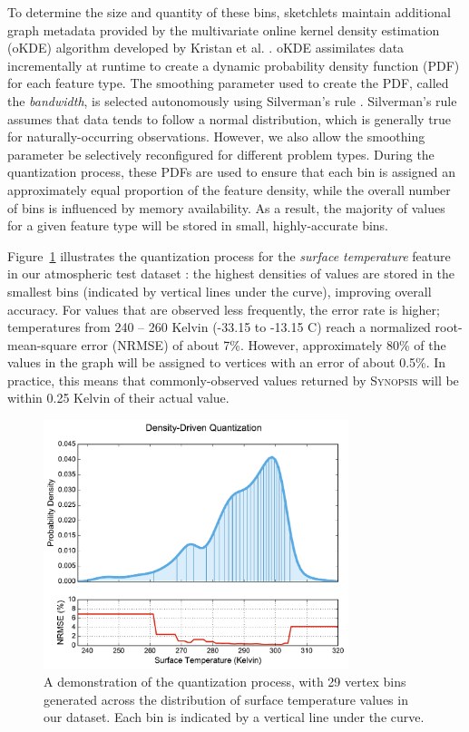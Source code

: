 To determine the size and quantity of these bins, sketchlets maintain additional graph metadata provided by the multivariate online kernel density estimation (oKDE) algorithm developed by Kristan et al. \cite{kristan2011multivariate}. oKDE assimilates data incrementally at runtime to create a dynamic probability density function (PDF) for each feature type. The smoothing parameter used to create the PDF, called the \emph{bandwidth}, is selected autonomously using Silverman's rule \cite{silverman1986density}. Silverman's rule assumes that data tends to follow a normal distribution, which is generally true for naturally-occurring observations. However, we also allow the smoothing parameter be selectively reconfigured for different problem types. During the quantization process, these PDFs are used to ensure that each bin is assigned an approximately equal proportion of the feature density, while the overall number of bins is influenced by memory availability. As a result, the majority of values for a given feature type will be stored in small, highly-accurate bins.

Figure~\ref{fig:quantization} illustrates the quantization process for the \emph{surface temperature} feature in our atmospheric test dataset \cite{noaa_nam}: the highest densities of values are stored in the smallest bins (indicated by vertical lines under the curve), improving overall accuracy. For values that are observed less frequently, the error rate is higher; temperatures from 240 -- 260 Kelvin (-33.15 to -13.15 \degree C) reach a normalized root-mean-square error (NRMSE) of about 7\%. However, approximately 80\% of the values in the graph will be assigned to vertices with an error of about 0.5\%. In practice, this means that commonly-observed values returned by \textsc{Synopsis} will be within 0.25 Kelvin of their actual value.

\begin{figure}
    \centerline{\includegraphics[width=3.5in]{figures/quantization.pdf}}
    \caption{A demonstration of the quantization process, with 29 vertex bins generated across the distribution of surface temperature values in our dataset. Each bin is indicated by a vertical line under the curve.}
    \label{fig:quantization}
\end{figure}

